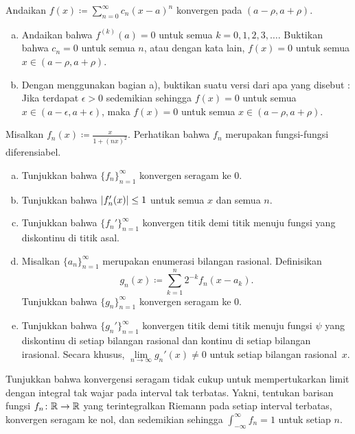 \begin{exercise}
\pagebreak[3]
Andaikan $f(x) \coloneqq \sum_{n=0}^\infty c_n {(x-a)}^n$ konvergen pada $(a-\rho,a+\rho)$.
\begin{enumerate}[a)]
\item
Andaikan bahwa $f^{(k)}(a) = 0$ untuk semua $k=0,1,2,3,\ldots$.  Buktikan bahwa
$c_n = 0$ untuk semua $n$, atau dengan kata lain,
$f(x) = 0$ untuk semua $x \in (a-\rho,a+\rho)$.
\item
Dengan menggunakan bagian a), buktikan suatu versi dari apa yang disebut
: Jika terdapat $\epsilon > 0$
sedemikian sehingga $f(x) = 0$ untuk semua $x \in (a-\epsilon, a+\epsilon)$, maka
$f(x) = 0$ untuk semua $x \in (a-\rho,a+\rho)$.
\end{enumerate}
\end{exercise}

\begin{exercise}
Misalkan $f_n(x) \coloneqq \frac{x}{1+{(nx)}^2}$.  Perhatikan bahwa $f_n$ merupakan
fungsi-fungsi diferensiabel.
\begin{enumerate}[a)]
\item
Tunjukkan bahwa $\{ f_n \}_{n=1}^\infty$ konvergen seragam ke 0.
\item
Tunjukkan bahwa $\lvert {f_n'(x)} \rvert \leq 1$ untuk semua $x$ dan semua $n$.
\item
Tunjukkan bahwa $\{ f_n' \}_{n=1}^\infty$ konvergen titik demi titik menuju fungsi yang diskontinu di
titik asal.
\item
Misalkan $\{ a_n \}_{n=1}^\infty$ merupakan enumerasi bilangan rasional.
Definisikan
\begin{equation*}
g_n(x) \coloneqq \sum_{k=1}^n 2^{-k} f_n(x-a_k) .
\end{equation*}
Tunjukkan bahwa $\{ g_n \}_{n=1}^\infty$ konvergen seragam ke 0.
\item
Tunjukkan bahwa $\{ g_n' \}_{n=1}^\infty$ konvergen titik demi titik menuju fungsi $\psi$ yang
diskontinu di setiap bilangan rasional dan kontinu di setiap
bilangan irasional.  Secara khusus, $\lim\limits_{n\to\infty} g_n'(x) \neq 0$ untuk
setiap bilangan rasional~$x$.
\end{enumerate}
\end{exercise}

\begin{exercise}
Tunjukkan bahwa konvergensi seragam tidak cukup untuk mempertukarkan limit dengan
integral tak wajar pada interval tak terbatas.
Yakni, tentukan barisan fungsi $f_n \colon {\mathbb{R}} \to
{\mathbb{R}}$ yang terintegralkan Riemann pada setiap interval terbatas,
konvergen seragam ke nol, dan sedemikian sehingga
$\int_{-\infty}^\infty f_n = 1$ untuk setiap $n$.
\end{exercise}


